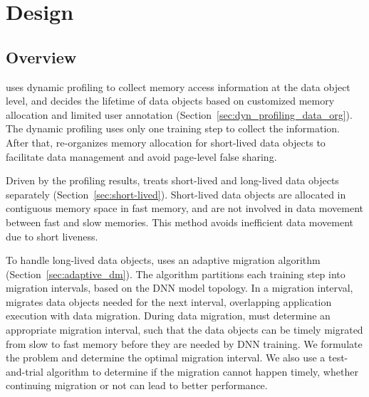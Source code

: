 \section{Design}
\subsection{Overview}

\textcolor{check}{\name uses dynamic profiling to  }collect memory access information at the data object level, and decides the lifetime of data objects based on customized memory allocation and limited user annotation (Section~\ref{sec:dyn_profiling_data_org}). The dynamic profiling uses only one training step to collect the information. After that, \name re-organizes memory allocation for short-lived data objects to facilitate data management and avoid page-level false sharing.

Driven by the profiling results, \name treats short-lived and long-lived data objects separately (Section~\ref{sec:short-lived}). Short-lived data objects are allocated in contiguous memory space in fast memory, and are not involved in data movement between fast and slow memories. This method avoids inefficient data movement due to short liveness. 

To handle long-lived data objects, \name uses an adaptive migration algorithm  (Section~\ref{sec:adaptive_dm}). The algorithm partitions each training step into migration intervals, based on the DNN model topology. In a migration interval, \name migrates data objects needed for the next interval, overlapping application execution with data migration. During data migration, \name must determine an appropriate migration interval, such that the data objects can be timely migrated from slow to fast memory before they are needed by DNN training. We formulate the problem and determine the optimal migration interval. We also use a test-and-trial algorithm to determine if the migration cannot happen timely, whether continuing migration or not can lead to better performance. 


